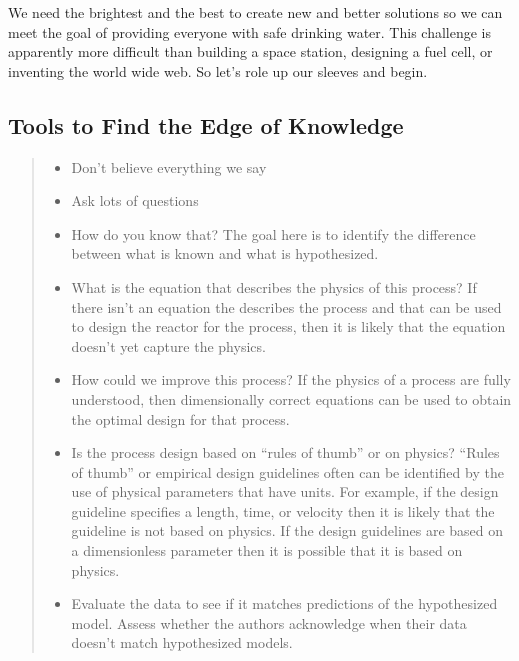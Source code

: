\documentclass[letterpaper,10pt,english]{sphinxmanual}
\begin{document}
We need the brightest and the best to create new and better solutions so we can meet the goal of providing everyone with safe drinking water. This challenge is apparently more difficult than building a space station, designing a fuel cell, or inventing the world wide web. So let’s role up our sleeves and begin.


\subsection{Tools to Find the Edge of Knowledge}
\label{\detokenize{Introduction/Introduction:tools-to-find-the-edge-of-knowledge}}\label{\detokenize{Introduction/Introduction:heading-tools-to-find-the-edge-of-knowledge}}\begin{quote}
\begin{itemize}
\item {} 
Don’t believe everything we say

\item {} 
Ask lots of questions

\end{itemize}
\begin{itemize}
\item {} 
How do you know that? The goal here is to identify the difference between what is known and what is hypothesized.

\item {} 
What is the equation that describes the physics of this process? If there isn’t an equation the describes the process and that can be used to design the reactor for the process, then it is likely that the equation doesn’t yet capture the physics.

\item {} 
How could we improve this process? If the physics of a process are fully understood, then dimensionally correct equations can be used to obtain the optimal design for that process.

\item {} 
Is the process design based on “rules of thumb” or on physics? “Rules of thumb” or empirical design guidelines often can be identified by the use of physical parameters that have units. For example, if the design guideline specifies a length, time, or velocity then it is likely that the guideline is not based on physics. If the design guidelines are based on a dimensionless parameter then it is possible that it is based on physics.

\end{itemize}
\begin{itemize}
\item {} 
Evaluate the data to see if it matches predictions of the hypothesized model. Assess whether the authors acknowledge when their data doesn’t match hypothesized models.


\end{itemize}
\end{quote}
\end{document}
